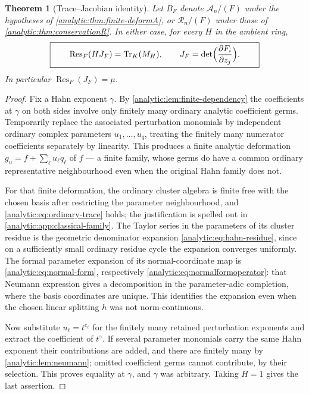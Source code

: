 \documentclass[11pt,letterpaper]{article}
\newtheorem{theorem}{Theorem}[section]
\theoremstyle{definition}
\theoremstyle{remark}
\newcommand{\A}{\mathscr A}
\newcommand{\RR}{\mathscr R}
\newcommand{\Res}{\operatorname{Res}}
\newcommand{\Tr}{\operatorname{Tr}}
\numberwithin{equation}{section}
\begin{document}
\begin{theorem}[Trace--Jacobian identity]\label{analytic:thm:trace}
Let $B_F$ denote $\A_n/(F)$ under the hypotheses of
\cref{analytic:thm:finite-deformA}, or $\RR_n/(F)$ under those of
\cref{analytic:thm:conservationR}. In either case, for every $H$ in the
ambient ring,
\begin{equation}\label{analytic:eq:trace}
 \boxed{\qquad \Res_F(HJ_F)=\Tr_K(M_H),\qquad
 J_F=\det\Bigl(\frac{\partial F_i}{\partial z_j}\Bigr).\qquad}
\end{equation}
In particular $\Res_F(J_F)=\mu$.
\end{theorem}
\begin{proof}
Fix a Hahn exponent $\gamma$. By \cref{analytic:lem:finite-dependency} the
coefficients at $\gamma$ on both sides involve only finitely many ordinary
analytic coefficient germs. Temporarily replace the associated perturbation
monomials by independent ordinary complex parameters $u_1,\ldots,u_q$,
treating the finitely many numerator coefficients separately by linearity.
This produces a finite analytic deformation
$g_u=f+\sum_{\ell}u_\ell q_\ell$ of $f$ --- a finite family, whose germs do
have a common ordinary representative neighbourhood even when the original
Hahn family does not.

For that finite deformation, the ordinary cluster algebra is finite free
with the chosen basis after restricting the parameter neighbourhood, and
\eqref{analytic:eq:ordinary-trace} holds; the justification is spelled out
in \cref{analytic:app:classical-family}. The Taylor series in the
parameters of its cluster residue is the geometric denominator expansion
\eqref{analytic:eq:hahn-residue}, since on a sufficiently small ordinary
residue cycle the expansion converges uniformly. The formal parameter
expansion of its normal-coordinate map is
\eqref{analytic:eq:normal-form}, respectively
\eqref{analytic:eq:normalformoperator}: that Neumann expression gives a
decomposition in the parameter-adic completion, where the basis coordinates
are unique. This identifies the expansion even when the chosen linear
splitting $h$ was not norm-continuous.

Now substitute $u_\ell=t^{e_\ell}$ for the finitely many retained
perturbation exponents and extract the coefficient of $t^\gamma$. If several
parameter monomials carry the same Hahn exponent their contributions are
added, and there are finitely many by
\cref{analytic:lem:neumann}; omitted coefficient germs cannot contribute,
by their selection. This proves equality at $\gamma$, and $\gamma$ was
arbitrary. Taking $H=1$ gives the last assertion.
\end{proof}
\end{document}
